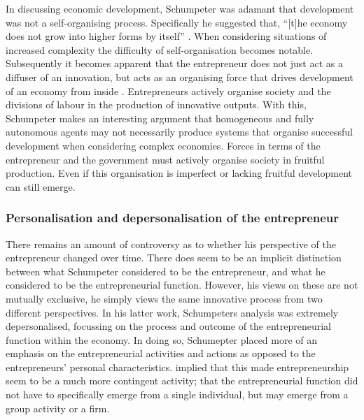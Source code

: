In discussing economic development, Schumpeter was adamant that development was not a self-organising process. Specifically he suggested that, ``[t]he economy does not grow into higher forms by itself'' \citep[p.~75]{Schumpeter2003}. When considering situations of increased complexity the difficulty of self-organisation becomes notable. Subsequently it becomes apparent that the entrepreneur does not just act as a diffuser of an innovation, but acts as an organising force that drives development of an economy from inside \citep{Marz1991}. Entrepreneurs actively organise society and the divisions of labour in the production of innovative outputs. With this, Schumpeter makes an interesting argument that homogeneous and fully autonomous agents may not necessarily produce systems that organise successful development when considering complex economies. Forces in terms of the entrepreneur and the government must actively organise society in fruitful production. Even if this organisation is imperfect or lacking fruitful development can still emerge.

\subsubsection{Personalisation and depersonalisation of the entrepreneur}

There remains an amount of controversy as to whether his perspective of the entrepreneur changed over time. There does seem to be an implicit distinction between what Schumpeter considered to be the entrepreneur, and what he considered to be the entrepreneurial function. However, his views on these are not mutually exclusive, he simply views the same innovative process from two different perspectives. In his latter work, Schumpeters analysis was extremely depersonalised, focussing on the process and outcome of the entrepreneurial function within the economy. In doing so, Schumepter placed more of an emphasis on the entrepreneurial activities and actions as opposed to the entrepreneurs' personal characteristics. \citet{BeckerKnudsen2003} implied that this made entrepreneurship seem to be a much more contingent activity; that the entrepreneurial function did not have to specifically emerge from a single individual, but may emerge from a group activity or a firm.

